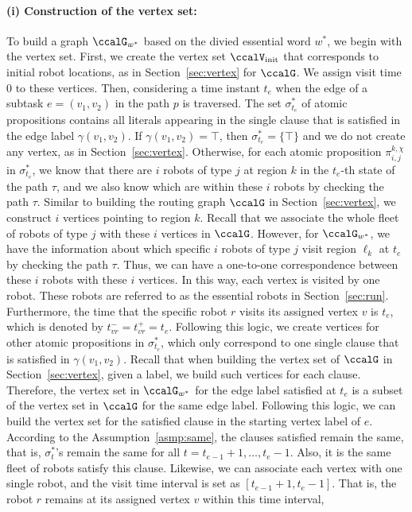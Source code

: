 \documentclass[Afour,sageh,times]{sagej}
\renewcommand{\ap}[3]{\mathcal{\pi}_{{#1},{#2}}^{#3}}
\begin{document}
{\paragraph{(i) Construction of the vertex set:} To build a graph $\ccalG_{w^*}$ based on the divied  essential word  $w^*$, we begin with the vertex set. First, we create the vertex set $\ccalV_{\text{init}}$ that corresponds to initial robot locations, as in Section~\ref{sec:vertex} for $\ccalG$.
We assign visit time 0 to these vertices. Then, considering a time instant $t_e$ when the edge of a subtask  $e = (v_1, v_2)$ in the path $p$ is traversed. The set $\sigma_{t_e}^*$ of atomic propositions  contains all literals appearing in the single clause that is satisfied in the edge label $\gamma(v_1, v_2)$. If $\gamma(v_1, v_2) = \top$, then $\sigma_{t_e}^* = \{\top\}$ and we do not create any vertex, as in Section~\ref{sec:vertex}. Otherwise, for each atomic proposition $\ap{i}{j}{k,\chi}$ in $\sigma_{t_e}^*$, we know that there are $i$ robots of type $j$ at region $k$ in the $t_e$-th state of the path $\tau$, and we also know which are within these $i$ robots by checking the path $\tau$. Similar to building the routing graph $\ccalG$ in Section~\ref{sec:vertex}, we construct $i$ vertices pointing to region $k$. Recall that we associate the whole fleet of robots of type $j$ with these $i$ vertices in $\ccalG$. However, for $\ccalG_{w^*}$, we have the information about which specific $i$ robots of type $j$ visit region $\ell_k$ at $t_e$ by checking the path $\tau$. Thus, we can have a one-to-one correspondence between these $i$ robots with these $i$ vertices. In this way, each vertex is visited by one robot. These robots are referred to as the essential robots in Section~\ref{sec:run}. Furthermore, the time that the specific  robot $r$ visits its assigned vertex $v$ is $t_e$, which is denoted by $t_{vr}^- = t_{vr}^+ = t_e$. Following this logic, we create vertices for other atomic propositions in $\sigma_{t_e}^*$, which only correspond to one single clause that is satisfied in $\gamma(v_1, v_2)$. Recall that when building the vertex set of $\ccalG$ in Section~\ref{sec:vertex}, given a label, we build such vertices for each clause. Therefore, the vertex set in $\ccalG_{w^*}$ for the edge label satisfied at $t_e$ is a subset of the vertex set in $\ccalG$ for the same edge label. Following this logic, we can build the vertex set for the satisfied clause in the starting vertex label of $e$. According to the Assumption~\ref{asmp:same}, the clauses satisfied remain the same, that is, $\sigma^*_t$'s remain the same for all $t= t_{e-1}+1, \ldots, t_{e}-1$. Also, it is the same fleet of robots satisfy this clause. Likewise, we can associate each vertex with one single robot, and the visit time interval is set as $[t_{e-1}+1, t_{e}-1]$. That is, the robot $r$ remains at its assigned vertex $v$  within this time interval,
}
\end{document}
